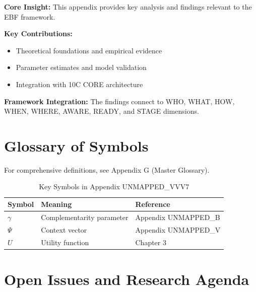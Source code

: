 \begin{tcolorbox}[colback=gray!5!white, colframe=gray!75!black,
    title=Appendix UNMAPPED_VVV7 Summary]

\textbf{Core Insight:}
This appendix provides key analysis and findings relevant to the EBF framework.

\textbf{Key Contributions:}
\begin{itemize}[nosep]
    \item Theoretical foundations and empirical evidence
    \item Parameter estimates and model validation
    \item Integration with 10C CORE architecture
\end{itemize}

\textbf{Framework Integration:}
The findings connect to WHO, WHAT, HOW, WHEN, WHERE, AWARE, READY, and STAGE dimensions.

\end{tcolorbox}

\section{Glossary of Symbols}
\label{sec:vvv7-glossary}

For comprehensive definitions, see Appendix G (Master Glossary).

\begin{table}[htbp]
\centering
\caption{Key Symbols in Appendix UNMAPPED_VVV7}
\begin{tabular}{lll}
\toprule
\textbf{Symbol} & \textbf{Meaning} & \textbf{Reference} \\
\midrule
$\gamma$ & Complementarity parameter & Appendix UNMAPPED_B \\
$\Psi$ & Context vector & Appendix UNMAPPED_V \\
$U$ & Utility function & Chapter 3 \\
\bottomrule
\end{tabular}
\end{table}



\section{Open Issues and Research Agenda}
\label{sec:x-open}

